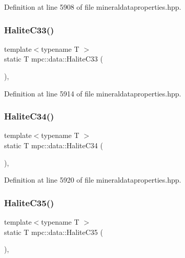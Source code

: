 Definition at line 5908 of file mineraldataproperties.\+hpp.

\mbox{\label{namespacempc_1_1data_a90eb6a9bf87fca1f5af924df1f3f5625}} 
\subsubsection{\texorpdfstring{Halite\+C33()}{HaliteC33()}}
{\footnotesize\ttfamily template$<$typename T $>$ \\
static T mpc\+::data\+::\+Halite\+C33 (\begin{DoxyParamCaption}{ }\end{DoxyParamCaption})\hspace{0.3cm}{\ttfamily [inline]}, {\ttfamily [static]}}



Definition at line 5914 of file mineraldataproperties.\+hpp.

\mbox{\label{namespacempc_1_1data_ae08f50d4f4c283b91d74ad50e4500b8b}} 
\subsubsection{\texorpdfstring{Halite\+C34()}{HaliteC34()}}
{\footnotesize\ttfamily template$<$typename T $>$ \\
static T mpc\+::data\+::\+Halite\+C34 (\begin{DoxyParamCaption}{ }\end{DoxyParamCaption})\hspace{0.3cm}{\ttfamily [inline]}, {\ttfamily [static]}}



Definition at line 5920 of file mineraldataproperties.\+hpp.

\mbox{\label{namespacempc_1_1data_a08029f544b5c59abbd188b8e2290230f}} 
\subsubsection{\texorpdfstring{Halite\+C35()}{HaliteC35()}}
{\footnotesize\ttfamily template$<$typename T $>$ \\
static T mpc\+::data\+::\+Halite\+C35 (\begin{DoxyParamCaption}{ }\end{DoxyParamCaption})\hspace{0.3cm}{\ttfamily [inline]}, {\ttfamily [static]}}



